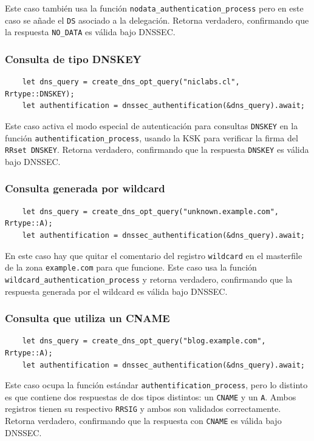 Este caso también usa la función \texttt{nodata\_authentication\_process} pero en este caso se añade el \texttt{DS} asociado a la delegación. Retorna verdadero, confirmando que la respuesta
\texttt{NO\_DATA} es válida bajo DNSSEC.

\subsubsection{Consulta de tipo DNSKEY}

\begin{lstlisting}
    let dns_query = create_dns_opt_query("niclabs.cl", Rrtype::DNSKEY);
    let authentification = dnssec_authentification(&dns_query).await;
\end{lstlisting}

Este caso activa el modo especial de autenticación para consultas \texttt{DNSKEY} en la función \texttt{authentification\_process}, usando la KSK para verificar la firma del \texttt{RRset DNSKEY}.
Retorna verdadero, confirmando que la respuesta \texttt{DNSKEY} es válida bajo DNSSEC.

\subsubsection{Consulta generada por wildcard}

\begin{lstlisting}
    let dns_query = create_dns_opt_query("unknown.example.com", Rrtype::A);
    let authentification = dnssec_authentification(&dns_query).await;
\end{lstlisting}

En este caso hay que quitar el comentario del registro \texttt{wildcard} en el masterfile de la zona \texttt{example.com} para que funcione.
Este caso usa la función \texttt{wildcard\_authentication\_process} y retorna verdadero, confirmando que la respuesta generada por el wildcard es válida bajo DNSSEC.

\subsubsection{Consulta que utiliza un CNAME}

\begin{lstlisting}
    let dns_query = create_dns_opt_query("blog.example.com", Rrtype::A);
    let authentification = dnssec_authentification(&dns_query).await;
\end{lstlisting}

Este caso ocupa la función estándar \texttt{authentification\_process}, pero lo distinto es que contiene dos respuestas de dos tipos distintos: un \texttt{CNAME} y un \texttt{A}.
Ambos registros tienen su respectivo \texttt{RRSIG} y ambos son validados correctamente. Retorna verdadero, confirmando que la respuesta con \texttt{CNAME} es válida bajo DNSSEC.















